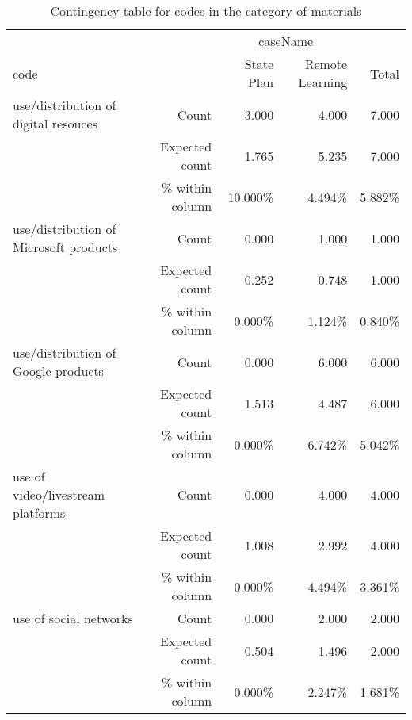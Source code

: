 \documentclass[6pt, oneside]{article}   	%
\begin{document}


\begin{table}[h]
	\centering
	\caption{Contingency table for codes in the category of materials}
	\label{tab:contingencyTables}
	{
		\begin{tabular}{lrrrr}
			\toprule
			\multicolumn{1}{c}{} & \multicolumn{1}{c}{} & \multicolumn{2}{c}{caseName} & \multicolumn{1}{c}{} \\
			\cline{3-4}
			code &  & State Plan & Remote Learning & Total  \\
			\cmidrule[0.4pt]{1-5}
			use/distribution of digital resouces & Count & 3.000 & 4.000 & 7.000  \\
			 & Expected count & 1.765 & 5.235 & 7.000  \\
			 &  \% within column & 10.000\% & 4.494\% & 5.882\%  \\
			use/distribution of Microsoft products & Count & 0.000 & 1.000 & 1.000  \\
			 & Expected count & 0.252 & 0.748 & 1.000  \\
			 &  \% within column & 0.000\% & 1.124\% & 0.840\%  \\
			use/distribution of Google products & Count & 0.000 & 6.000 & 6.000  \\
			 & Expected count & 1.513 & 4.487 & 6.000  \\
			 &  \% within column & 0.000\% & 6.742\% & 5.042\%  \\
			use of video/livestream platforms & Count & 0.000 & 4.000 & 4.000  \\
			 & Expected count & 1.008 & 2.992 & 4.000  \\
			 &  \% within column & 0.000\% & 4.494\% & 3.361\%  \\
			use of social networks & Count & 0.000 & 2.000 & 2.000  \\
			 & Expected count & 0.504 & 1.496 & 2.000  \\
			 &  \% within column & 0.000\% & 2.247\% & 1.681\%  \\

\end{tabular}}
\end{table}
\end{document}
